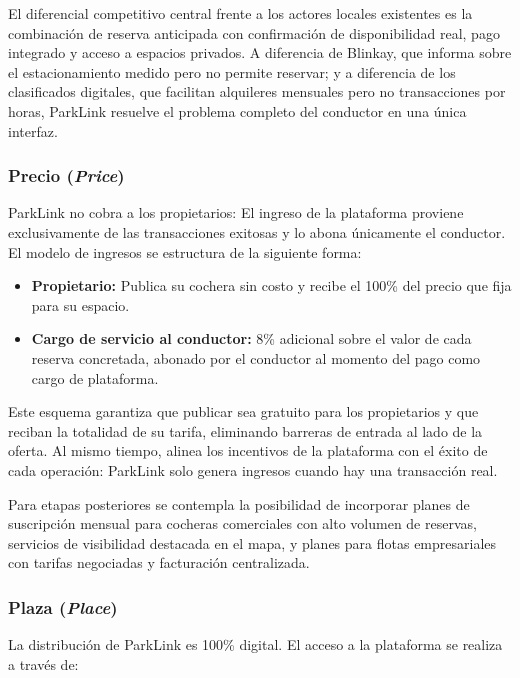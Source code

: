 El diferencial competitivo central frente a los actores locales existentes es la combinación de reserva anticipada con confirmación de disponibilidad real, pago integrado y acceso a espacios privados. A diferencia de Blinkay, que informa sobre el estacionamiento medido pero no permite reservar; y a diferencia de los clasificados digitales, que facilitan alquileres mensuales pero no transacciones por horas, ParkLink resuelve el problema completo del conductor en una única interfaz.

\subsubsection{Precio (\textit{Price})}

ParkLink no cobra a los propietarios: El ingreso de la plataforma proviene exclusivamente de las transacciones exitosas y lo abona únicamente el conductor. El modelo de ingresos se estructura de la siguiente forma:

\begin{itemize}
    \item \textbf{Propietario:} Publica su cochera sin costo y recibe el 100\% del precio que fija para su espacio.
    \item \textbf{Cargo de servicio al conductor:} 8\% adicional sobre el valor de cada reserva concretada, abonado por el conductor al momento del pago como cargo de plataforma.
\end{itemize}

Este esquema garantiza que publicar sea gratuito para los propietarios y que reciban la totalidad de su tarifa, eliminando barreras de entrada al lado de la oferta. Al mismo tiempo, alinea los incentivos de la plataforma con el éxito de cada operación: ParkLink solo genera ingresos cuando hay una transacción real.

Para etapas posteriores se contempla la posibilidad de incorporar planes de suscripción mensual para cocheras comerciales con alto volumen de reservas, servicios de visibilidad destacada en el mapa, y planes para flotas empresariales con tarifas negociadas y facturación centralizada.

\subsubsection{Plaza (\textit{Place})}

La distribución de ParkLink es 100\% digital. El acceso a la plataforma se realiza a través de:

